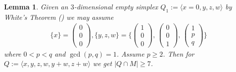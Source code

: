 \documentclass[12pt, english]{article}
\newtheorem{lemma}[definition]{Lemma}
\begin{document}
\begin{lemma} \label{lemma_White_simplex_parallel__not_empty}
	Given an $3$-dimensional empty simplex $Q_1 := \langle x=0,y,z,w \rangle$ by White's Theorem (\cite[p.34, the Terminal Lemma]{Oda88}) we may assume 
	\begin{align} \label{empty_simplex_vertices_tilde}
		\{ x \} = \begin{pmatrix} 0\\0\\0 \end{pmatrix}, \{y,z,w \} = \{ \begin{pmatrix} 1\\0\\0 \end{pmatrix}, \, \begin{pmatrix} 0\\0\\1 \end{pmatrix}, \, \begin{pmatrix} 1\\p\\q \end{pmatrix} \}
	\end{align}
	where $0 < p < q$ and $\gcd(p,q) = 1$. Assume $p \geq 2$. Then for $Q:= \langle x,y,z,w,y+w,z+w \rangle$ we get $|Q \cap M| \geq 7$. 
\end{lemma}
\end{document}

